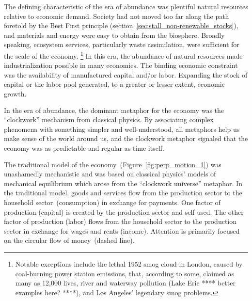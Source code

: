The defining characteristic of the era of abundance 
was plentiful natural resources relative to economic demand.
Society had not moved too far along the path foretold
by the Best First principle (section~\ref{sec:stall_non-renewable_stocks}),
and materials and energy were easy to obtain from the biosphere.
Broadly speaking, ecosystem services,
particularly waste assimilation,
were sufficient for the scale of the economy.%
	\footnote{
	Notable exceptions include
	the lethal 1952 smog cloud in London, 
	caused by coal-burning power station emissions,
	that, according to some, 
	claimed as many as 12,000 lives,
	river and waterway pollution (Lake Erie **** better examples here? ****), 
	and Los Angeles' legendary smog problems.\cite{Davis2002,Bell2004}
	}
In this era, the abundance of natural resources
made industrialization possible in many economies.
The binding economic constraint was the availability of 
manufactured capital and/or labor.
Expanding the stock of capital or the labor pool generated, 
to a greater or lesser extent, 
economic growth.

In the era of abundance, 
the dominant metaphor for the economy 
was the ``clockwork'' mechanism from classical physics.
By associating complex phenomena with
something simpler and well-understood,
all metaphors help us make sense of the world around us, and
the clockwork metaphor signaled that the economy 
was as predictable and regular as time itself.

The traditional model of the economy~(Figure~\ref{fig:perp_motion_1})
was unashamedly mechanistic
and was based on classical physics' models 
of mechanical equilibrium which arose from the 
``clockwork universe'' metaphor.\cite{Ingrao1990, Walras1892, Walras1993}
In the traditional model,
goods and services flow from the production sector
to the household sector~(consumption)
in exchange for payments.
One factor of production (capital) is created
by the production sector and self-used.
The other factor of production (labor)
flows from the household sector to the
production sector in exchange for wages and rents (income).
Attention is primarily focused on the circular flow
of money~(dashed line).

